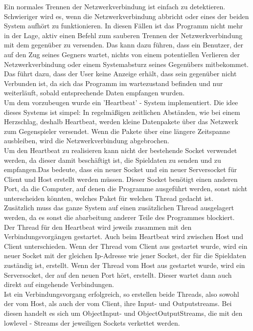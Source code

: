 \documentclass[12pt,a4paper]{article}
\begin{document}
{Ein normales Trennen der Netzwerkverbindung ist einfach zu detektieren. Schwieriger wird es, wenn die Netzwerkverbindung abbricht oder eines der beiden System aufhört zu funktionieren. In diesen Fällen ist das Programm nicht mehr in der Lage, aktiv einen Befehl zum sauberen Trennen der Netzwerkverbindung mit dem gegenüber zu versenden. Das kann dazu führen, dass ein Benutzer, der auf den Zug seines Gegners wartet, nichts von einem potentiellen Verlieren der Netzwerkverbindung oder einem Systemabsturz seines Gegenübers mitbekommet. Das führt  dazu, dass der User keine Anzeige erhält, dass sein gegenüber nicht Verbunden ist, da sich das Programm im wartezustand befinden und nur weiterläuft, sobald entsprechende Daten empfangen wurden.\\
Um dem vorzubeugen wurde ein 'Heartbeat' - System implementiert. Die idee dieses Systems ist simpel: In regelmäßigen zeitlichen Abständen, wie bei einem Herzschlag, deshalb Heartbeat, werden kleine Datenpakete über das Netzwerk zum Gegenspieler versendet. Wenn die Pakete über eine längere Zeitspanne ausbleiben, wird die Netzwerkverbindung abgebrochen.\\[3ex]
Um den Heartbeat zu realisieren kann nicht der bestehende Socket verwendet werden, da dieser damit beschäftigt ist, die Spieldaten zu senden und zu empfangen.Das bedeute, dass ein neuer Socket und ein neuer Serversocket für Client und Host erstellt werden müssen. Dieser Socket benötigt einen anderen Port, da die Computer, auf denen die Programme ausgeführt werden, sonst nicht unterscheiden könnten, welches Paket für welchen Thread gedacht ist.\\ Zusätzlich muss das ganze System auf einen zusätzlichen Thread ausgelagert werden, da es sonst die abarbeitung anderer Teile des Programmes blockiert. \\
Der Thread für den Heartbeat wird jeweils zusammen mit den Verbindungsvorgängen gestartet. Auch beim Heartbeat wird zwischen Host und Client unterschieden. 
Wenn der Thread vom Client aus gestartet wurde, wird ein neuer Socket mit der gleichen Ip-Adresse wie jener Socket, der für die Spieldaten zuständig ist, erstellt. Wenn der Thread vom Host aus gestartet wurde, wird ein Serversocket, der auf den neuen Port hört, erstellt. Dieser wartet dann auch direkt auf eingehende Verbindungen. \\
Ist ein Verbindungsvorgang erfolgreich, so erstellen beide Threads, also sowohl der vom Host, als auch der vom Client, ihre Input- und Outputstreams. Bei diesen handelt es sich um ObjectInput- und ObjectOutputStreams, die mit den lowlevel - Streams der jeweiligen Sockets verkettet werden. \\
}
\end{document}
